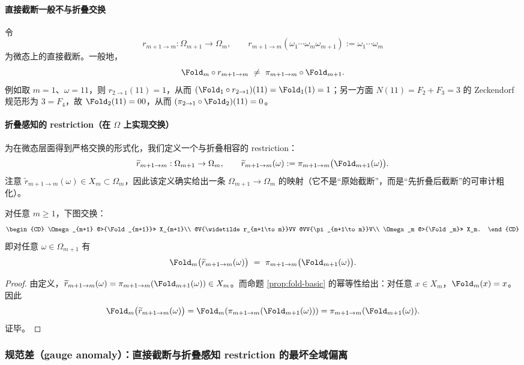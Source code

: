 \paragraph{直接截断一般不与折叠交换}
令
\[
r_{m+1\to m}:\Omega_{m+1}\to\Omega_m,\qquad
r_{m+1\to m}(\omega_1\cdots\omega_m\omega_{m+1}):=\omega_1\cdots\omega_m
\]
为微态上的直接截断。一般地，
\[
\Fold_m\circ r_{m+1\to m}\ \neq\ \pi_{m+1\to m}\circ \Fold_{m+1}.
\]
例如取 $m=1$、$\omega=11$，则 $r_{2\to 1}(11)=1$，从而 $(\Fold_1\circ r_{2\to 1})(11)=\Fold_1(1)=1$；另一方面 $N(11)=F_2+F_3=3$ 的 Zeckendorf 规范形为 $3=F_4$，故 $\Fold_2(11)=00$，从而 $(\pi_{2\to 1}\circ \Fold_2)(11)=0$。

\paragraph{折叠感知的 restriction（在 $\Omega$ 上实现交换）}
为在微态层面得到严格交换的形式化，我们定义一个与折叠相容的 restriction：
\[
\widetilde r_{m+1\to m}:\Omega_{m+1}\to \Omega_m,\qquad
\widetilde r_{m+1\to m}(\omega):=\pi_{m+1\to m}\bigl(\Fold_{m+1}(\omega)\bigr).
\]
注意 $\widetilde r_{m+1\to m}(\omega)\in X_m\subset\Omega_m$，因此该定义确实给出一条 $\Omega_{m+1}\to\Omega_m$ 的映射（它不是“原始截断”，而是“先折叠后截断”的可审计粗化）。

\begin{proposition}[跨分辨率相容的交换图]\label{prop:fold-omega-commute}
对任意 $m\ge 1$，下图交换：
\[
\begin{CD}
\Omega_{m+1} @>{\Fold_{m+1}}>> X_{m+1}\\
@V{\widetilde r_{m+1\to m}}VV @VV{\pi_{m+1\to m}}V\\
\Omega_m @>{\Fold_m}>> X_m.
\end{CD}
\]
即对任意 $\omega\in\Omega_{m+1}$ 有
\[
\Fold_m\bigl(\widetilde r_{m+1\to m}(\omega)\bigr)
\ =\
\pi_{m+1\to m}\bigl(\Fold_{m+1}(\omega)\bigr).
\]
\end{proposition}

\begin{proof}
由定义，$\widetilde r_{m+1\to m}(\omega)=\pi_{m+1\to m}(\Fold_{m+1}(\omega))\in X_m$。而命题 \ref{prop:fold-basic} 的幂等性给出：对任意 $x\in X_m$，$\Fold_m(x)=x$。因此
\[
\Fold_m\bigl(\widetilde r_{m+1\to m}(\omega)\bigr)
=\Fold_m\!\left(\pi_{m+1\to m}(\Fold_{m+1}(\omega))\right)
=\pi_{m+1\to m}(\Fold_{m+1}(\omega)).
\]
证毕。
\end{proof}

\subsubsection{规范差（gauge anomaly）：直接截断与折叠感知 restriction 的最坏全域偏离}\label{subsec:fold-gauge-anomaly}
